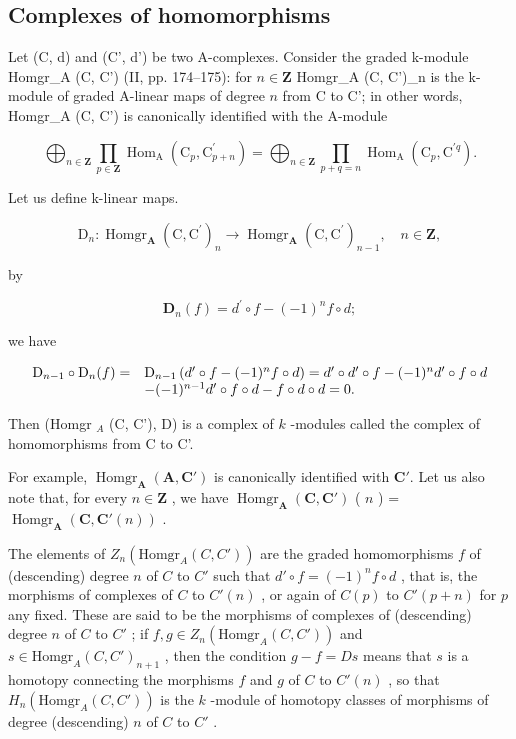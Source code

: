 \subsection{Complexes of homomorphisms}

Let (C, d) and (C', d') be two A-complexes. Consider the graded k-module Homgr\_A (C, C') (II, pp. 174–175): for \(n \in \mathbf{Z}\) Homgr\_A (C, C')\_n is the k-module of graded A-linear maps of degree \(n\) from C to C'; in other words, Homgr\_A (C, C') is canonically identified with the A-module

\[
\bigoplus_ {n \in \mathbf {Z}} \prod_ {p \in \mathbf {Z}} \operatorname{Hom} _ {\mathrm{A}} \left(\mathrm{C} _ {p}, \mathrm{C} _ {p + n} ^ {\prime}\right) = \bigoplus_ {n \in \mathbf {Z}} \prod_ {p + q = n} \operatorname{Hom} _ {\mathrm{A}} \left(\mathrm{C} _ {p}, \mathrm{C} ^ {\prime q}\right).
\]

Let us define k-linear maps.

\[
\mathrm{D} _ {n}: \operatorname{Homgr} _ {\mathbf {A}} (\mathrm{C}, \mathrm{C} ^ {\prime}) _ {n} \rightarrow \operatorname{Homgr} _ {\mathbf {A}} (\mathrm{C}, \mathrm{C} ^ {\prime}) _ {n - 1}, \quad n \in \mathbf {Z},
\]

by

\[
\mathbf {D} _ {n} (f) = d ^ {\prime} \circ f - (- 1) ^ {n} f \circ d;\tag{1}
\]

we have

\[
\begin{array}{r l} \mathrm{D} _ {n - 1} \circ \mathrm{D} _ {n} (f) = & \mathrm{D} _ {n - 1} \left(d ^ {\prime} \circ f - (- 1) ^ {n} f \circ d\right) = d ^ {\prime} \circ d ^ {\prime} \circ f - (- 1) ^ {n} d ^ {\prime} \circ f \circ d \\ & - (- 1) ^ {n - 1} d ^ {\prime} \circ f \circ d - f \circ d \circ d = 0. \end{array}
\]

Then (Homgr \(_{A}\) (C, C'), D) is a complex of \(k\) -modules called the complex of homomorphisms from C to C'.

For example, \(\operatorname{Homgr}_{\mathbf{A}}(\mathbf{A}, \mathbf{C}')\) is canonically identified with \(\mathbf{C}'\). Let us also note that, for every \(n \in \mathbf{Z}\) , we have \(\operatorname{Homgr}_{\mathbf{A}}(\mathbf{C}, \mathbf{C}')\) ( \(n\) ) = \(\operatorname{Homgr}_{\mathbf{A}}(\mathbf{C}, \mathbf{C}'(n))\) .

The elements of \(Z_n(\text{Homgr}_A(C, C'))\) are the graded homomorphisms \(f\) of (descending) degree \(n\) of \(C\) to \(C'\) such that \(d' \circ f = (-1)^n f \circ d\) , that is, the morphisms of complexes of \(C\) to \(C'(n)\) , or again of \(C(p)\) to \(C'(p + n)\) for \(p\) any fixed. These are said to be the morphisms of complexes of (descending) degree \(n\) of \(C\) to \(C'\) ; if \(f, g \in Z_n(\text{Homgr}_A(C, C'))\) and \(s \in \text{Homgr}_A(C, C')_{n+1}\) , then the condition \(g - f = Ds\) means that \(s\) is a homotopy connecting the morphisms \(f\) and \(g\) of \(C\) to \(C'(n)\) , so that \(H_n(\text{Homgr}_A(C, C'))\) is the \(k\) -module of homotopy classes of morphisms of degree (descending) \(n\) of \(C\) to \(C'\) .

